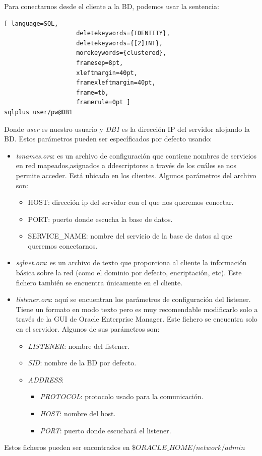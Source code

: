 Para conectarnos desde el cliente a la BD, podemos usar la sentencia:

\begin{lstlisting}[ language=SQL,
                    deletekeywords={IDENTITY},
                    deletekeywords={[2]INT},
                    morekeywords={clustered},
                    framesep=8pt,
                    xleftmargin=40pt,
                    framexleftmargin=40pt,
                    frame=tb,
                    framerule=0pt ]
sqlplus user/pw@DB1
\end{lstlisting}
Donde \textit{user} es nuestro usuario y \textit{DB1} es la dirección IP del servidor alojando la BD. Estos parámetros pueden ser específicados por defecto usando: 
\begin{itemize}
\item \textit{tsnames.ora}: es un archivo de configuración que contiene nombres de servicios en red mapeados,asignados a ddescriptores a través de los cuáles se nos permite acceder. Está ubicado en los clientes. Algunos parámetros del archivo son:
\begin{itemize}
\item HOST: dirección ip del servidor con el que nos queremos conectar.
\item PORT: puerto donde escucha la base de datos.
\item SERVICE\_NAME: nombre del servicio de la base de datos al que queremos conectarnos.
\end{itemize}
\item \textit{sqlnet.ora}: es un archivo de texto que proporciona al cliente la información básica sobre la red (como el dominio por defecto, encriptación, etc). Este fichero también se encuentra únicamente en el cliente.
\item \textit{listener.ora}: aquí se encuentran los parámetros de configuración del listener. Tiene un formato en modo texto pero es muy recomendable modificarlo solo a través de la GUI de Oracle Enterprise Manager. Este fichero se encuentra solo en el servidor. Algunos de sus parámetros son:
\begin{itemize}
\item \textit{LISTENER}: nombre del listener.
\item \textit{SID}: nombre de la BD por defecto.
\item \textit{ADDRESS}: 
  \begin{itemize}
    \item \textit{PROTOCOL}: protocolo usado para la comunicación.
    \item \textit{HOST}: nombre del host.
    \item \textit{PORT}: puerto donde escuchará el listener.
  \end{itemize}
\end{itemize}
\end{itemize}
Estos ficheros pueden ser encontrados en $\$ORACLE\_HOME/network/admin$

